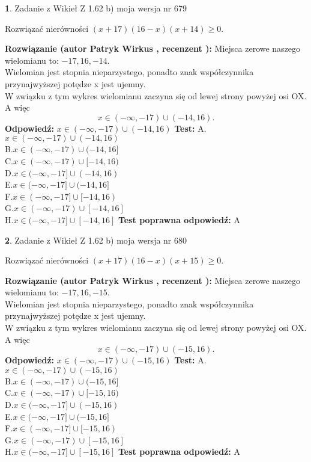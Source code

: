 \documentclass[12pt, a4paper]{article}
\theoremstyle{definition} %
\newtheorem{zad}{}
\newcommand{\zadStart}[1]{\begin{zad}#1\newline}
\newcommand{\zadStop}{\end{zad}}
\newcommand{\rozwStart}[2]{\noindent \textbf{Rozwiązanie (autor #1 , recenzent #2): }\newline}
\newcommand{\rozwStop}{\newline}
\newcommand{\odpStart}{\noindent \textbf{Odpowiedź:}\newline}
\newcommand{\odpStop}{\newline}
\newcommand{\testStart}{\noindent \textbf{Test:}\newline}
\newcommand{\testStop}{\newline}
\newcommand{\kluczStart}{\noindent \textbf{Test poprawna odpowiedź:}\newline}
\newcommand{\kluczStop}{\newline}
\begin{document}
\zadStart{Zadanie z Wikieł Z 1.62 b) moja wersja nr 679}

Rozwiązać nierówności $(x+17)(16-x)(x+14)\ge0$.
\zadStop
\rozwStart{Patryk Wirkus}{}
Miejsca zerowe naszego wielomianu to: $-17, 16, -14$.\\
Wielomian jest stopnia nieparzystego, ponadto znak współczynnika przy\linebreak najwyższej potędze x jest ujemny.\\ W związku z tym wykres wielomianu zaczyna się od lewej strony powyżej osi OX. A więc $$x \in (-\infty,-17) \cup (-14,16).$$
\rozwStop
\odpStart
$x \in (-\infty,-17) \cup (-14,16)$
\odpStop
\testStart
A.$x \in (-\infty,-17) \cup (-14,16)$\\
B.$x \in (-\infty,-17) \cup (-14,16]$\\
C.$x \in (-\infty,-17) \cup [-14,16)$\\
D.$x \in (-\infty,-17] \cup (-14,16)$\\
E.$x \in (-\infty,-17] \cup (-14,16]$\\
F.$x \in (-\infty,-17] \cup [-14,16)$\\
G.$x \in (-\infty,-17) \cup [-14,16]$\\
H.$x \in (-\infty,-17] \cup [-14,16]$
\testStop
\kluczStart
A
\kluczStop



\zadStart{Zadanie z Wikieł Z 1.62 b) moja wersja nr 680}

Rozwiązać nierówności $(x+17)(16-x)(x+15)\ge0$.
\zadStop
\rozwStart{Patryk Wirkus}{}
Miejsca zerowe naszego wielomianu to: $-17, 16, -15$.\\
Wielomian jest stopnia nieparzystego, ponadto znak współczynnika przy\linebreak najwyższej potędze x jest ujemny.\\ W związku z tym wykres wielomianu zaczyna się od lewej strony powyżej osi OX. A więc $$x \in (-\infty,-17) \cup (-15,16).$$
\rozwStop
\odpStart
$x \in (-\infty,-17) \cup (-15,16)$
\odpStop
\testStart
A.$x \in (-\infty,-17) \cup (-15,16)$\\
B.$x \in (-\infty,-17) \cup (-15,16]$\\
C.$x \in (-\infty,-17) \cup [-15,16)$\\
D.$x \in (-\infty,-17] \cup (-15,16)$\\
E.$x \in (-\infty,-17] \cup (-15,16]$\\
F.$x \in (-\infty,-17] \cup [-15,16)$\\
G.$x \in (-\infty,-17) \cup [-15,16]$\\
H.$x \in (-\infty,-17] \cup [-15,16]$
\testStop
\kluczStart
A
\kluczStop
\end{document}
